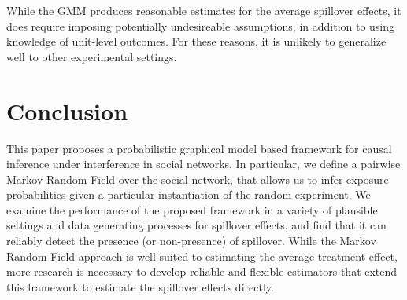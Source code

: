 \documentclass{article}
\begin{document}
While the GMM produces reasonable estimates for the average spillover effects, it does require imposing potentially undesireable assumptions, in 
addition to using knowledge of unit-level outcomes. For these reasons, it is unlikely to generalize well to other experimental settings.   

\section{Conclusion}

This paper proposes a probabilistic graphical model based framework for causal inference under interference in social networks. In particular, 
we define a pairwise Markov Random Field over the social network, that allows us to infer exposure probabilities given a particular instantiation of the 
random experiment. We examine the performance of the proposed framework in a variety of plausible settings and data generating processes for spillover effects,
and find that it can reliably detect the presence (or non-presence) of spillover. While the Markov Random Field approach is well suited to estimating the average treatment effect, 
more research is necessary to develop reliable and flexible estimators that extend this framework to estimate the spillover effects directly. 


















\end{document}
